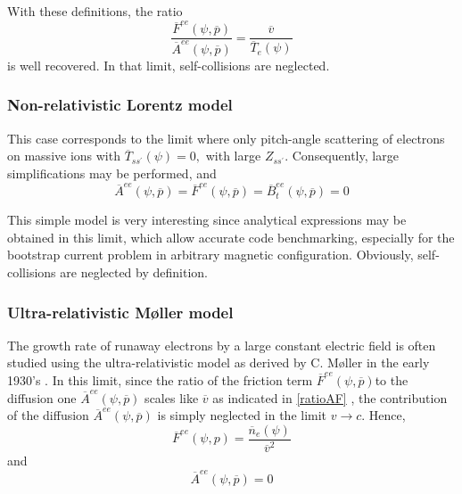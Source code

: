 With these definitions, the ratio
\begin{equation}
\frac{\overline{F}^{ee}\left( \psi ,\overline{p}\right) }{\overline{A}
^{ee}\left( \psi ,\overline{p}\right) }=\frac{\overline{v}}{\overline{T}%
_{e}\left( \psi \right) }
\end{equation}
is well recovered. In that limit, self-collisions are neglected.

\subsubsection{Non-relativistic Lorentz model}

This case corresponds to the limit where only pitch-angle scattering of
electrons on massive ions with $\overline{T}_{ss^{\prime }}\left( \psi
\right) =0,$ with large $Z_{ss^{\prime }}.$ Consequently, large
simplifications may be performed, and
\begin{equation}
\overline{A}^{ee}\left( \psi ,\overline{p}\right) =\overline{F}^{ee}\left(
\psi ,\overline{p}\right) =\overline{B}_{t}^{ee}\left( \psi ,\overline{p}%
\right) =0
\end{equation}

This simple model is very interesting since analytical expressions may be
obtained in this limit, which allow accurate code benchmarking, especially
for the bootstrap current problem in arbitrary magnetic configuration.
Obviously, self-collisions are neglected by definition.

\subsubsection{Ultra-relativistic M\o ller model}

The growth rate of runaway electrons by a large constant electric field is
often studied using the ultra-relativistic model as derived by C. M\o ller
in the early 1930's \cite{mol32}. In this limit, since the ratio of the
friction term $\overline{F}^{ee}\left( \psi ,\overline{p}\right) $to the
diffusion one $\overline{A}^{ee}\left( \psi ,\overline{p}\right) $ scales
like $\overline{v}$ as indicated in \ref{ratioAF} , the contribution of the
diffusion $\overline{A}^{ee}\left( \psi ,\overline{p}\right) $ is simply
neglected in the limit $v\rightarrow c.$ Hence,
\begin{equation}
\overline{F}^{ee}\left( \psi ,p\right) =\frac{\overline{n}_{e}\left( \psi
\right) }{\overline{v}^{2}}
\end{equation}
and
\begin{equation}
\overline{A}^{ee}\left( \psi ,\overline{p}\right) =0
\end{equation}

